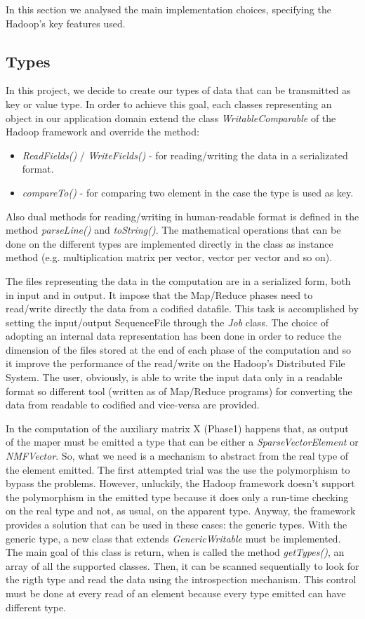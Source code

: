 \documentclass[a4paper,12pt]{article}
\newcommand{\METHOD}[1] {\textit{#1}}
\newcommand{\CLASS}[1] {\textit{#1}}
\begin{document}
In this section we analysed the main implementation choices, specifying the Hadoop's key features used.


\subsection{Types}
In this project, we decide to create our types of data that can be transmitted as key or value type. In order to achieve this goal, each classes representing an object in our application domain extend the class \CLASS{WritableComparable} of the Hadoop framework and override the method:
\begin{itemize}
  \item \METHOD{ReadFields()} / \METHOD{WriteFields()} - for reading/writing the data in a serializated format.
  \item \METHOD{compareTo()} - for comparing two element in the case the type is used as key.
\end{itemize}

Also dual methods for reading/writing in human-readable format is defined in the method \METHOD{parseLine()} and \METHOD{toString()}. The mathematical operations that can be done on the different types are implemented directly in the class as instance method (e.g. multiplication matrix per vector, vector per vector and so on). 

The files representing the data in the computation are in a serialized form, both in input and in output. It impose that the Map/Reduce phases need to read/write directly the data from a codified datafile. This task is accomplished by setting the input/output SequenceFile through the \CLASS{Job} class. The choice of adopting an internal data representation has been done in order to reduce the dimension of the files stored at the end of each phase of the computation and so it improve the performance of the read/write on the Hadoop's Distributed File System. The user, obviously, is able to write the input data only in a readable format so different tool (written as of Map/Reduce programs) for converting the data from readable to codified and vice-versa are provided.

In the computation of the auxiliary matrix X (Phase1) happens that, as output of the maper must be emitted a type that can be either a \CLASS{SparseVectorElement} or \CLASS{NMFVector}. So, what we need is a mechanism to abstract from the real type of the element emitted. The first attempted trial was the use the polymorphism to bypass the problems. However, unluckily, the Hadoop framework doesn't support the polymorphism in the emitted type because it does only a run-time checking on the real type and not, as usual, on the apparent type. Anyway, the framework provides a solution that can be used in these cases: the generic types. With the generic type, a new class that extends \CLASS{GenericWritable} must be implemented. The main goal of this class is return, when is called the method \METHOD{getTypes()}, an array of all the supported classes. Then, it can be scanned sequentially to look for the rigth type and read the data using the introspection mechanism. This control must be done at every read of an element because every type emitted can have different type.
\end{document}
